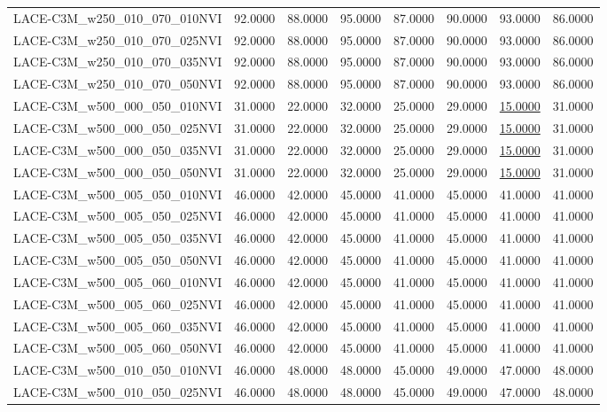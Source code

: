 \begin{table}
\begin{tabular}{lrrrrrrr}
LACE-C3M\_w250\_010\_070\_010NVI & 92.0000 & 88.0000 & 95.0000 & 87.0000 & 90.0000 & 93.0000 & 86.0000 \\
LACE-C3M\_w250\_010\_070\_025NVI & 92.0000 & 88.0000 & 95.0000 & 87.0000 & 90.0000 & 93.0000 & 86.0000 \\
LACE-C3M\_w250\_010\_070\_035NVI & 92.0000 & 88.0000 & 95.0000 & 87.0000 & 90.0000 & 93.0000 & 86.0000 \\
LACE-C3M\_w250\_010\_070\_050NVI & 92.0000 & 88.0000 & 95.0000 & 87.0000 & 90.0000 & 93.0000 & 86.0000 \\
LACE-C3M\_w500\_000\_050\_010NVI & 31.0000 & 22.0000 & 32.0000 & 25.0000 & 29.0000 & \underline{15.0000} & 31.0000 \\
LACE-C3M\_w500\_000\_050\_025NVI & 31.0000 & 22.0000 & 32.0000 & 25.0000 & 29.0000 & \underline{15.0000} & 31.0000 \\
LACE-C3M\_w500\_000\_050\_035NVI & 31.0000 & 22.0000 & 32.0000 & 25.0000 & 29.0000 & \underline{15.0000} & 31.0000 \\
LACE-C3M\_w500\_000\_050\_050NVI & 31.0000 & 22.0000 & 32.0000 & 25.0000 & 29.0000 & \underline{15.0000} & 31.0000 \\
LACE-C3M\_w500\_005\_050\_010NVI & 46.0000 & 42.0000 & 45.0000 & 41.0000 & 45.0000 & 41.0000 & 41.0000 \\
LACE-C3M\_w500\_005\_050\_025NVI & 46.0000 & 42.0000 & 45.0000 & 41.0000 & 45.0000 & 41.0000 & 41.0000 \\
LACE-C3M\_w500\_005\_050\_035NVI & 46.0000 & 42.0000 & 45.0000 & 41.0000 & 45.0000 & 41.0000 & 41.0000 \\
LACE-C3M\_w500\_005\_050\_050NVI & 46.0000 & 42.0000 & 45.0000 & 41.0000 & 45.0000 & 41.0000 & 41.0000 \\
LACE-C3M\_w500\_005\_060\_010NVI & 46.0000 & 42.0000 & 45.0000 & 41.0000 & 45.0000 & 41.0000 & 41.0000 \\
LACE-C3M\_w500\_005\_060\_025NVI & 46.0000 & 42.0000 & 45.0000 & 41.0000 & 45.0000 & 41.0000 & 41.0000 \\
LACE-C3M\_w500\_005\_060\_035NVI & 46.0000 & 42.0000 & 45.0000 & 41.0000 & 45.0000 & 41.0000 & 41.0000 \\
LACE-C3M\_w500\_005\_060\_050NVI & 46.0000 & 42.0000 & 45.0000 & 41.0000 & 45.0000 & 41.0000 & 41.0000 \\
LACE-C3M\_w500\_010\_050\_010NVI & 46.0000 & 48.0000 & 48.0000 & 45.0000 & 49.0000 & 47.0000 & 48.0000 \\
LACE-C3M\_w500\_010\_050\_025NVI & 46.0000 & 48.0000 & 48.0000 & 45.0000 & 49.0000 & 47.0000 & 48.0000 \\

\end{tabular}
\end{table}
